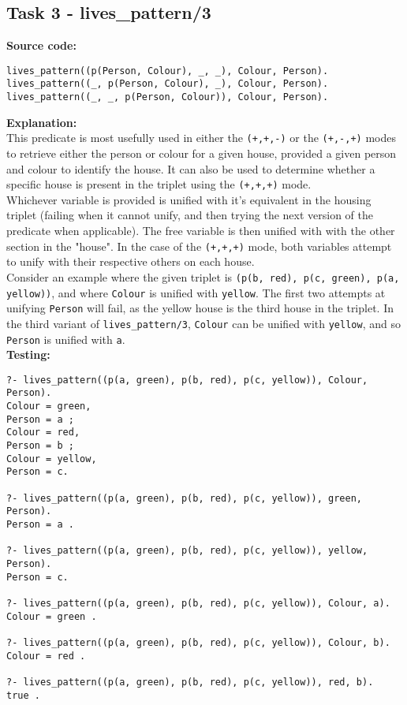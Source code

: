 \documentclass[11pt]{article}
\begin{document}
\subsection{Task 3 - lives\_pattern/3}
\textbf{Source code:}
\begin{verbatim}
lives_pattern((p(Person, Colour), _, _), Colour, Person).
lives_pattern((_, p(Person, Colour), _), Colour, Person).
lives_pattern((_, _, p(Person, Colour)), Colour, Person).
\end{verbatim}

\textbf{Explanation:} \\
This predicate is most usefully used in either the {\verb|(+,+,-)|} or the {\verb|(+,-,+)|} modes to retrieve either the person or colour for a given house, provided a given person and colour to identify the house. It can also be used to determine whether a specific house is present in the triplet using the {\verb|(+,+,+)|} mode. \\

Whichever variable is provided is unified with it's equivalent in the housing triplet (failing when it cannot unify, and then trying the next version of the predicate when applicable). The free variable is then unified with with the other section in the "house". In the case of the {\verb|(+,+,+)|} mode, both variables attempt to unify with their respective others on each house. \\

Consider an example where the given triplet is {\verb|(p(b, red), p(c, green), p(a, yellow))|}, and where {\verb|Colour|} is unified with {\verb|yellow|}. The first two attempts at unifying {\verb|Person|} will fail, as the yellow house is the third house in the triplet. In the third variant of {\verb|lives_pattern/3|}, {\verb|Colour|} can be unified with {\verb|yellow|}, and so {\verb|Person|} is unified with {\verb|a|}. \\

\textbf{Testing:}
\begin{verbatim}
?- lives_pattern((p(a, green), p(b, red), p(c, yellow)), Colour, Person).
Colour = green,
Person = a ;
Colour = red,
Person = b ;
Colour = yellow,
Person = c.

?- lives_pattern((p(a, green), p(b, red), p(c, yellow)), green, Person).
Person = a .

?- lives_pattern((p(a, green), p(b, red), p(c, yellow)), yellow, Person).
Person = c.

?- lives_pattern((p(a, green), p(b, red), p(c, yellow)), Colour, a).
Colour = green .

?- lives_pattern((p(a, green), p(b, red), p(c, yellow)), Colour, b).
Colour = red .

?- lives_pattern((p(a, green), p(b, red), p(c, yellow)), red, b).
true .
\end{verbatim}
\newpage
\end{document}
